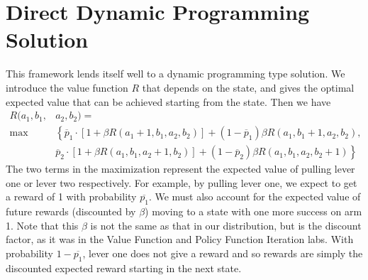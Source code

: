 \section*{Direct Dynamic Programming Solution}
This framework lends itself well to a dynamic programming type solution.
We introduce the value function $R$ that depends on the state, and gives
the optimal expected value that can be achieved
starting from the state.  Then we have
\begin{equation}
\label{recurs}
\begin{aligned}
R(a_1,b_1,&a_2,b_2) =\\
 \max&\left\{\overline{p}_1\cdot[1 + \beta R(a_1+1,b_1,a_2,b_2)] +
 (1-\overline{p}_1)\beta R(a_1,b_1+1,a_2,b_2)\right. ,\\
&  \left.\overline{p}_2\cdot[1 + \beta R(a_1,b_1,a_2+1,b_2)] +
(1-\overline{p}_2)\beta R(a_1,b_1,a_2,b_2+1)\right\}
\end{aligned}
\end{equation}
The two terms in the maximization represent the expected value of pulling lever
one or lever two respectively.  For example, by pulling lever one, we expect
to get a reward of 1 with probability $\overline{p_1}$.
We must also account for the expected value of future rewards
(discounted by $\beta$) moving to a state with one more success on arm 1.
Note that this $\beta$ is not the same as that in our distribution, but is the discount
factor, as it was in the Value Function and Policy Function Iteration labs.
With probability $1-\overline{p_1}$, lever one does not give a reward and so
rewards are simply the discounted expected reward starting in the next state.

